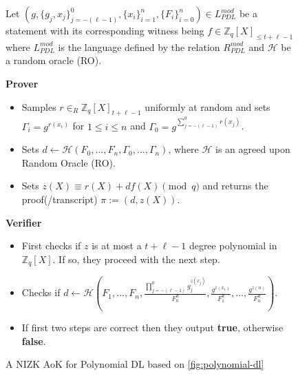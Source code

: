 \begin{figure}[ht]
    \centering
    \begin{tcolorbox}[title=$\pi_{PDL}^{mod}$, width=0.9\textwidth, colframe=blue!75!black, colback=blue!10, sharp corners]
        Let $(g,\{g_j,x_j\}_{j=-(\ell-1)}^0,\{x_i\}_{i=1}^n,\{F_i\}_{i=0}^n)\in L_{PDL}^{mod}$ be a statement with its corresponding witness being $f\in\mathbb{Z}_q[X]_{\leq t+\ell-1}$ 
        where $L_{PDL}^{mod}$ is the language defined by the relation $R_{PDL}^{mod}$ and $\mathcal{H}$ be a 
        random oracle (RO).
        
        \vspace{0.5em}
        \textbf{Prover}
        \begin{itemize}
            \item Samples $r\in_{R}\mathbb{Z}_q[X]_{t+\ell-1}$ uniformly at random and sets 
                $\Gamma_i=g^{r(x_i)}$ for $1\leq i\leq n$ and $\Gamma_0=g^{\sum_{j=-(\ell-1)}^{0}r(x_j)}$.
            \item Sets $d\leftarrow \mathcal{H}(F_0, \dots, F_n, \Gamma_0, \dots, \Gamma_n)$, where $\mathcal{H}$ is 
                an agreed upon Random Oracle (RO).
            \item Sets $z(X)\equiv r(X)+df(X) \pmod{q}$ and returns the proof(/transcript) $\pi:= (d,z(X))$.
        \end{itemize}
        
        \vspace{0.5em}
        \textbf{Verifier}
        \begin{itemize}
            \item First checks if $z$ is at most a $t+\ell-1$ degree polynomial in $\mathbb{Z}_q[X]$. If so, they proceed with the next step.
            \item Checks if $d\leftarrow \mathcal{H}(F_1, \dots, F_n,\frac{\prod_{j=-(\ell-1)}^{0}g_j^{z(x_j)}}{F_0^d},\frac{g^{z(x_1)}}{F_1^d}, \dots, \frac{g^{z(n)}}{F_n^d})$. 
            \item If first two steps are correct then they output \textbf{true}, otherwise \textbf{false}.
        \end{itemize}
    \end{tcolorbox}
    \caption{A NIZK AoK for Polynomial DL based on \ref{fig:polynomial-dl}}
    \label{fig:mod-polynomial-dl}
\end{figure}
